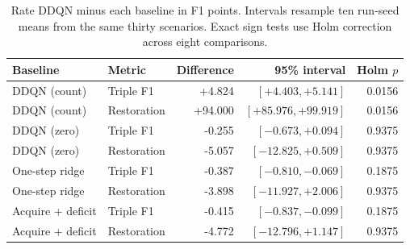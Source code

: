 \begin{table}[t]
\centering
\caption{Rate DDQN minus each baseline in F1 points. Intervals resample ten run-seed means from the same thirty scenarios. Exact sign tests use Holm correction across eight comparisons.}
\label{tab:reward_validation_tests}
\footnotesize
\setlength{\tabcolsep}{3pt}
\begin{tabular*}{\textwidth}{@{\extracolsep{\fill}}llrrr@{}}
\toprule
Baseline & Metric & Difference & 95\% interval & Holm $p$ \\
\midrule
DDQN (count) & Triple F1 & +4.824 & $[+4.403,+5.141]$ & 0.0156 \\
DDQN (count) & Restoration & +94.000 & $[+85.976,+99.919]$ & 0.0156 \\
DDQN (zero) & Triple F1 & -0.255 & $[-0.673,+0.094]$ & 0.9375 \\
DDQN (zero) & Restoration & -5.057 & $[-12.825,+0.509]$ & 0.9375 \\
One-step ridge & Triple F1 & -0.387 & $[-0.810,-0.069]$ & 0.1875 \\
One-step ridge & Restoration & -3.898 & $[-11.927,+2.006]$ & 0.9375 \\
Acquire + deficit & Triple F1 & -0.415 & $[-0.837,-0.099]$ & 0.1875 \\
Acquire + deficit & Restoration & -4.772 & $[-12.796,+1.147]$ & 0.9375 \\
\bottomrule
\end{tabular*}
\end{table}

